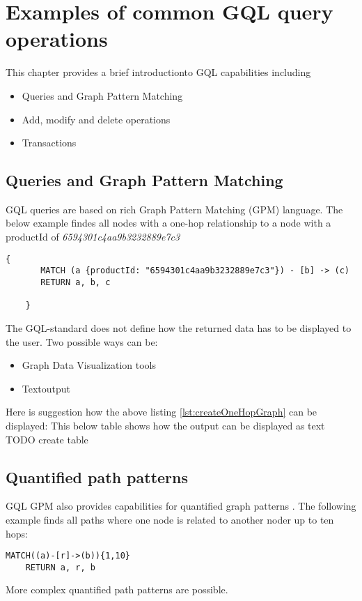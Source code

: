 \section{Examples of common GQL query operations}
\label{sec:iso:examples}
This chapter provides a brief introductionto GQL capabilities including
\begin{itemize}
	\item Queries and Graph Pattern Matching
	\item Add, modify and delete operations
	\item Transactions
\end{itemize}

\subsection{Queries and Graph Pattern Matching}
\label{subsec:iso:examples:queries_and_graph_pattern_matching}
GQL queries are based on rich Graph Pattern Matching (GPM) language.
The below example findes all nodes with a one-hop relationship to a node with a 
productId of \textit{6594301c4aa9b3232889e7c3} \citep{hare_isoiec_2024}
\begin{lstlisting}[caption={Example for one hop graph pattern query}, label={lst:createOneHopGraph}]
    {
       MATCH (a {productId: "6594301c4aa9b3232889e7c3"}) - [b] -> (c)
	   RETURN a, b, c

    }
\end{lstlisting}
The GQL-standard does not define how the returned data has to be displayed
to the user. Two possible ways can be:
\begin{itemize}
	\item Graph Data Visualization tools
	\item Textoutput
\end{itemize}
Here is suggestion how the above listing \ref{lst:createOneHopGraph} can be displayed:
This below table shows how the output can be displayed as text \\
TODO create table



\subsection{Quantified path patterns}
\label{subsec:iso:examples:quantified_path_patterns}
GQL GPM also provides capabilities for quantified graph patterns \citep{fan_adding_2016}.
The following example finds all paths where one node is related to another noder
up to ten hops:
\begin{lstlisting}[caption={Example for quantified graph pattern}, label={lst:createQuantifiedGraph}]
    MATCH((a)-[r]->(b)){1,10}
	RETURN a, r, b
\end{lstlisting}
More complex quantified path patterns are possible. 
